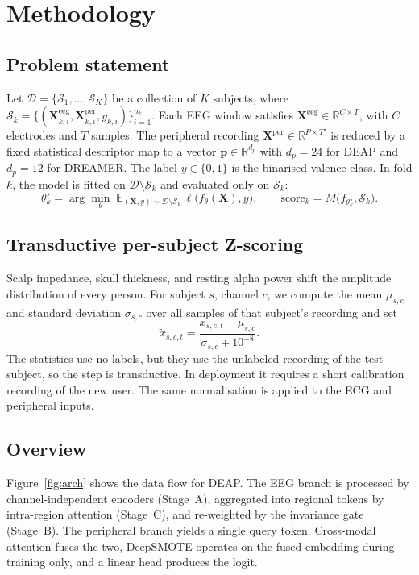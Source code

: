 \documentclass[a4paper,fleqn]{cas-sc}
\begin{document}
\section{Methodology}
\label{sec:method}

\subsection{Problem statement}
Let $\mathcal{D}=\{\mathcal{S}_1,\dots,\mathcal{S}_K\}$ be a collection of $K$ subjects, where $\mathcal{S}_k=\{(\mathbf{X}^{\mathrm{eeg}}_{k,i},\mathbf{X}^{\mathrm{per}}_{k,i},y_{k,i})\}_{i=1}^{n_k}$. Each EEG window satisfies $\mathbf{X}^{\mathrm{eeg}}\in\mathbb{R}^{C\times T}$, with $C$ electrodes and $T$ samples. The peripheral recording $\mathbf{X}^{\mathrm{per}}\in\mathbb{R}^{P\times T'}$ is reduced by a fixed statistical descriptor map to a vector $\mathbf{p}\in\mathbb{R}^{d_p}$ with $d_p=24$ for DEAP and $d_p=12$ for DREAMER. The label $y\in\{0,1\}$ is the binarised valence class. In fold $k$, the model is fitted on $\mathcal{D}\setminus\mathcal{S}_k$ and evaluated only on $\mathcal{S}_k$:
\begin{equation}
\theta_k^\star=\arg\min_{\theta}\;\mathbb{E}_{(\mathbf{X},y)\sim\mathcal{D}\setminus\mathcal{S}_k}\,\ell\bigl(f_\theta(\mathbf{X}),y\bigr),\qquad
\text{score}_k=M\bigl(f_{\theta_k^\star},\mathcal{S}_k\bigr).
\end{equation}

\subsection{Transductive per-subject Z-scoring}
Scalp impedance, skull thickness, and resting alpha power shift the amplitude distribution of every person. For subject $s$, channel $c$, we compute the mean $\mu_{s,c}$ and standard deviation $\sigma_{s,c}$ over all samples of that subject's recording and set
\begin{equation}
\tilde{x}_{s,c,t}=\frac{x_{s,c,t}-\mu_{s,c}}{\sigma_{s,c}+10^{-8}}.\label{eq:z}
\end{equation}
The statistics use no labels, but they use the unlabeled recording of the test subject, so the step is transductive. In deployment it requires a short calibration recording of the new user. The same normalisation is applied to the ECG and peripheral inputs.

\subsection{Overview}
Figure~\ref{fig:arch} shows the data flow for DEAP. The EEG branch is processed by channel-independent encoders (Stage~A), aggregated into regional tokens by intra-region attention (Stage~C), and re-weighted by the invariance gate (Stage~B). The peripheral branch yields a single query token. Cross-modal attention fuses the two, DeepSMOTE operates on the fused embedding during training only, and a linear head produces the logit.
\end{document}
